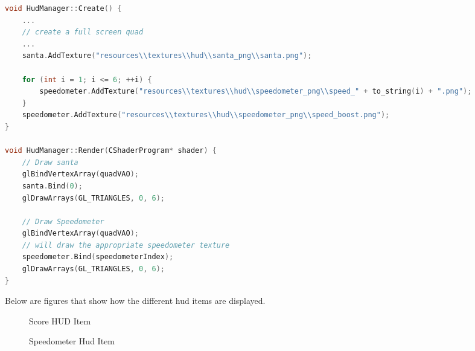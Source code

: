 \documentclass[10pt]{report}
\begin{document}
\begin{lstlisting}[language=c]
void HudManager::Create() {
    ...
    // create a full screen quad
    ...
    santa.AddTexture("resources\\textures\\hud\\santa_png\\santa.png");

    for (int i = 1; i <= 6; ++i) {
        speedometer.AddTexture("resources\\textures\\hud\\speedometer_png\\speed_" + to_string(i) + ".png");
    }
    speedometer.AddTexture("resources\\textures\\hud\\speedometer_png\\speed_boost.png");
}

void HudManager::Render(CShaderProgram* shader) {
    // Draw santa
    glBindVertexArray(quadVAO);
    santa.Bind(0);
    glDrawArrays(GL_TRIANGLES, 0, 6);

    // Draw Speedometer
    glBindVertexArray(quadVAO);
    // will draw the appropriate speedometer texture
    speedometer.Bind(speedometerIndex);
    glDrawArrays(GL_TRIANGLES, 0, 6);
}
\end{lstlisting}

Below are figures that show how the different hud items are displayed.
\begin{figure}[H]
    \begin{minipage}{.5\textwidth}
        \centering
        \caption{Score HUD Item}
    \end{minipage}
    \begin{minipage}{.5\textwidth}
        \centering
        \caption{Speedometer Hud Item}
    \end{minipage}
\end{figure}
\end{document}
